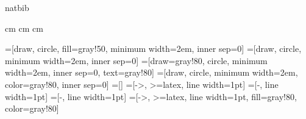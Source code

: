 \usepackage{bibtopic} 
\newcommand{\subbib}[2]{\begin{btSect}{#1}
  \subsubsection{#2}
  \btPrintCited
  \btPrintNotCited
  \end{btSect}
}
\newcommand{\SubBib}[2]{\begin{btSect}{#1}
  \chapter{#2}
  \btPrintCited
  \btPrintNotCited
  \end{btSect}
}

\DeclareRobustCommand{\etalchar}

\usepackage{natbib}
\usepackage{amsmath}
\usepackage[T1]{fontenc}
\usepackage[french]{babel}
\usepackage{enumerate}
\usepackage{eurosym}
\usepackage{epsfig}
\usepackage{url}
\usepackage{color}
\usepackage{xcolor}
\usepackage{xspace}
\usepackage{cmbright}
\usepackage{tikz}

\newcommand{\SR}[2]{\textcolor{blue}{SR~:\xspace}\textcolor{gray}{#1\xspace}\textcolor{red}{#2\xspace}}
\newcommand{\Col}[1]{\noindent [{\sl Collab. princip.~: #1}]\\}
\newcommand{\APT}{AgroParisTech\xspace}

\textwidth 17cm
\textheight 25.5cm 
 cm 
 cm
 cm

\newcommand{\ns}{2em}
\newcommand{\veu}{2*\ns} %
\newcommand{\heu}{2.5*\ns} %
=[draw, circle, fill=gray!50, minimum width=\ns, inner sep=0]
=[draw, circle, minimum width=\ns, inner sep=0]
=[draw=gray!80, circle, minimum width=\ns, inner sep=0, text=gray!80]
=[draw, circle, minimum width=\ns, color=gray!80, inner sep=0]
=[]
=[->, >=latex, line width=1pt]
=[-, line width=1pt]
=[-, line width=1pt]
=[->, >=latex, line width=1pt, fill=gray!80, color=gray!80]
